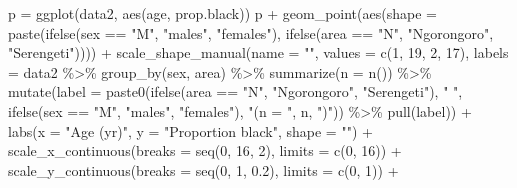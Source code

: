 \documentclass[
]{article}
\newenvironment{Shaded}{\begin{snugshade}}{\end{snugshade}}
\newcommand{\AttributeTok}[1]{\textcolor[rgb]{0.77,0.63,0.00}{#1}}
\newcommand{\DecValTok}[1]{\textcolor[rgb]{0.00,0.00,0.81}{#1}}
\newcommand{\FloatTok}[1]{\textcolor[rgb]{0.00,0.00,0.81}{#1}}
\newcommand{\FunctionTok}[1]{\textcolor[rgb]{0.00,0.00,0.00}{#1}}
\newcommand{\NormalTok}[1]{#1}
\newcommand{\OtherTok}[1]{\textcolor[rgb]{0.56,0.35,0.01}{#1}}
\newcommand{\SpecialCharTok}[1]{\textcolor[rgb]{0.00,0.00,0.00}{#1}}
\newcommand{\StringTok}[1]{\textcolor[rgb]{0.31,0.60,0.02}{#1}}
\begin{document}
\begin{Shaded}
\begin{Highlighting}[]
\NormalTok{p }\OtherTok{=} \FunctionTok{ggplot}\NormalTok{(data2, }\FunctionTok{aes}\NormalTok{(age, prop.black))}
\NormalTok{p }\SpecialCharTok{+} \FunctionTok{geom\_point}\NormalTok{(}\FunctionTok{aes}\NormalTok{(}\AttributeTok{shape =} \FunctionTok{paste}\NormalTok{(}\FunctionTok{ifelse}\NormalTok{(sex }\SpecialCharTok{==} \StringTok{"M"}\NormalTok{, }\StringTok{"males"}\NormalTok{, }\StringTok{"females"}\NormalTok{), }\FunctionTok{ifelse}\NormalTok{(area }\SpecialCharTok{==} \StringTok{"N"}\NormalTok{, }\StringTok{"Ngorongoro"}\NormalTok{, }\StringTok{"Serengeti"}\NormalTok{)))) }\SpecialCharTok{+} 
  \FunctionTok{scale\_shape\_manual}\NormalTok{(}\AttributeTok{name =} \StringTok{""}\NormalTok{, }
                     \AttributeTok{values =} \FunctionTok{c}\NormalTok{(}\DecValTok{1}\NormalTok{, }\DecValTok{19}\NormalTok{, }\DecValTok{2}\NormalTok{, }\DecValTok{17}\NormalTok{), }
                     \AttributeTok{labels =}\NormalTok{ data2 }\SpecialCharTok{\%\textgreater{}\%}
                       \FunctionTok{group\_by}\NormalTok{(sex, area) }\SpecialCharTok{\%\textgreater{}\%}
                       \FunctionTok{summarize}\NormalTok{(}\AttributeTok{n =} \FunctionTok{n}\NormalTok{()) }\SpecialCharTok{\%\textgreater{}\%}
                       \FunctionTok{mutate}\NormalTok{(}\AttributeTok{label =} \FunctionTok{paste0}\NormalTok{(}\FunctionTok{ifelse}\NormalTok{(area }\SpecialCharTok{==} \StringTok{"N"}\NormalTok{, }\StringTok{"Ngorongoro"}\NormalTok{, }\StringTok{"Serengeti"}\NormalTok{), }\StringTok{" "}\NormalTok{, }\FunctionTok{ifelse}\NormalTok{(sex }\SpecialCharTok{==} \StringTok{"M"}\NormalTok{, }\StringTok{"males"}\NormalTok{, }\StringTok{"females"}\NormalTok{), }\StringTok{"(n = "}\NormalTok{, n, }\StringTok{")"}\NormalTok{)) }\SpecialCharTok{\%\textgreater{}\%}
                       \FunctionTok{pull}\NormalTok{(label)) }\SpecialCharTok{+}
  \FunctionTok{labs}\NormalTok{(}\AttributeTok{x =} \StringTok{"Age (yr)"}\NormalTok{, }\AttributeTok{y =} \StringTok{"Proportion black"}\NormalTok{, }\AttributeTok{shape =} \StringTok{""}\NormalTok{) }\SpecialCharTok{+}
  \FunctionTok{scale\_x\_continuous}\NormalTok{(}\AttributeTok{breaks =} \FunctionTok{seq}\NormalTok{(}\DecValTok{0}\NormalTok{, }\DecValTok{16}\NormalTok{, }\DecValTok{2}\NormalTok{), }\AttributeTok{limits =} \FunctionTok{c}\NormalTok{(}\DecValTok{0}\NormalTok{, }\DecValTok{16}\NormalTok{)) }\SpecialCharTok{+}
  \FunctionTok{scale\_y\_continuous}\NormalTok{(}\AttributeTok{breaks =} \FunctionTok{seq}\NormalTok{(}\DecValTok{0}\NormalTok{, }\DecValTok{1}\NormalTok{, }\FloatTok{0.2}\NormalTok{), }\AttributeTok{limits =} \FunctionTok{c}\NormalTok{(}\DecValTok{0}\NormalTok{, }\DecValTok{1}\NormalTok{)) }\SpecialCharTok{+}

\end{Highlighting}
\end{Shaded}
\end{document}
